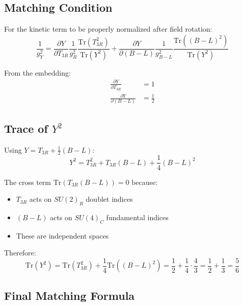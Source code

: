 \documentclass[11pt,a4paper]{article}
\begin{document}
\subsection{Matching Condition}
\label{subsec:matching-condition}

For the kinetic term to be properly normalized after field rotation:
\begin{equation}
\label{eq:kinetic-matching}
\frac{1}{g_Y^2} = \frac{\partial Y}{\partial T_{3R}} \frac{1}{g_R^2} \frac{\mathrm{Tr}(T_{3R}^2)}{\mathrm{Tr}(Y^2)}
+ \frac{\partial Y}{\partial (B-L)} \frac{1}{g_{B-L}^2} \frac{\mathrm{Tr}((B-L)^2)}{\mathrm{Tr}(Y^2)}
\end{equation}

From the embedding:
\begin{align}
\label{eq:partial-t3r}
\frac{\partial Y}{\partial T_{3R}} &= 1 \\
\label{eq:partial-b-l}
\frac{\partial Y}{\partial (B-L)} &= \frac{1}{2}
\end{align}

\subsection{Trace of $Y^2$}
\label{subsec:trace-y-squared}

Using $Y = T_{3R} + \frac{1}{2}(B-L)$:
\begin{equation}
\label{eq:y-squared}
Y^2 = T_{3R}^2 + T_{3R} (B-L) + \frac{1}{4}(B-L)^2
\end{equation}

The cross term $\mathrm{Tr}(T_{3R} (B-L)) = 0$ because:
\begin{itemize}
\item $T_{3R}$ acts on $SU(2)_R$ doublet indices
\item $(B-L)$ acts on $SU(4)_C$ fundamental indices
\item These are independent spaces
\end{itemize}

Therefore:
\begin{equation}
\label{eq:trace-y-squared}
\mathrm{Tr}(Y^2) = \mathrm{Tr}(T_{3R}^2) + \frac{1}{4} \mathrm{Tr}((B-L)^2)
= \frac{1}{2} + \frac{1}{4} \cdot \frac{4}{3} = \frac{1}{2} + \frac{1}{3} = \frac{5}{6}
\end{equation}

\subsection{Final Matching Formula}
\label{subsec:final-matching}
\end{document}
